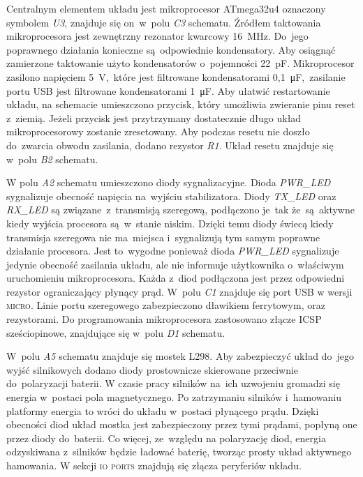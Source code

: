 \documentclass[11pt]{article}
\begin{document}
Centralnym elementem układu jest mikroprocesor ATmega32u4 oznaczony symbolem \textit{U3}, znajduje się on~w~polu \textit{C3} schematu.
Źródłem taktowania mikroprocesora jest zewnętrzny rezonator kwarcowy 16~\si{\mega\hertz}.
Do~jego poprawnego działania konieczne są~odpowiednie kondensatory.
Aby osiągnąć zamierzone taktowanie użyto kondensatorów o~pojemności 22~\si{\pico\farad}.
Mikroprocesor zasilono napięciem 5~\si{\volt},~które jest filtrowane kondensatorami 0,1~\si{\micro\farad},~zasilanie portu USB jest filtrowane kondensatorami 1~\si{\micro\farad}.
Aby ułatwić restartowanie układu, na schemacie umieszczono przycisk, który umożliwia zwieranie pinu reset z~ziemią.
Jeżeli przycisk jest przytrzymany dostatecznie długo układ mikroprocesorowy zostanie zresetowany.
Aby podczas resetu nie doszło do~zwarcia obwodu zasilania, dodano rezystor \textit{R1}.
Układ resetu znajduje się w~polu \textit{B2} schematu.

W polu \textit{A2} schematu umieszczono diody sygnalizacyjne.
Dioda \textit{PWR\_LED} sygnalizuje obecność napięcia na~wyjściu stabilizatora.
Diody \textit{TX\_LED} oraz \textit{RX\_LED} są związane~z~transmisją szeregową, podłączono je~tak że~są~aktywne kiedy wyjścia procesora są~w~stanie niskim.
Dzięki temu diody świecą kiedy transmisja szeregowa nie ma~miejsca i~sygnalizują tym samym poprawne działanie procesora.
Jest to~wygodne ponieważ dioda \textit{PWR\_LED} sygnalizuje jedynie obecność zasilania układu, ale nie informuje użytkownika o~właściwym uruchomieniu mikroprocesora.
Każda z~diod podłączona jest przez odpowiedni rezystor ograniczający płynący prąd.
W~polu \textit{C1} znajduje się port USB w wersji \textsc{micro}. Linie portu szeregowego zabezpieczono dławikiem ferrytowym, oraz rezystorami.
Do programowania mikroprocesora zastosowano złącze ICSP sześciopinowe, znajdujące się w~polu \textit{D1} schematu.

W~polu \textit{A5} schematu znajduje się mostek L298.
Aby zabezpieczyć układ do~jego wyjść silnikowych dodano diody prostownicze skierowane przeciwnie do~polaryzacji baterii.
W czasie pracy silników na~ich uzwojeniu gromadzi się energia w~postaci pola magnetycznego.
Po zatrzymaniu silników i~hamowaniu platformy energia to wróci do układu w~postaci płynącego prądu.
Dzięki obecności diod układ mostka jest zabezpieczony przez tymi prądami, popłyną one przez diody do~baterii.
 Co więcej, ze~względu na polaryzację diod, energia odzyskiwana z~silników będzie ładować baterię, tworząc prosty układ aktywnego hamowania.
W sekcji \textsc{io ports} znajdują się złącza peryferiów układu.
\end{document}
